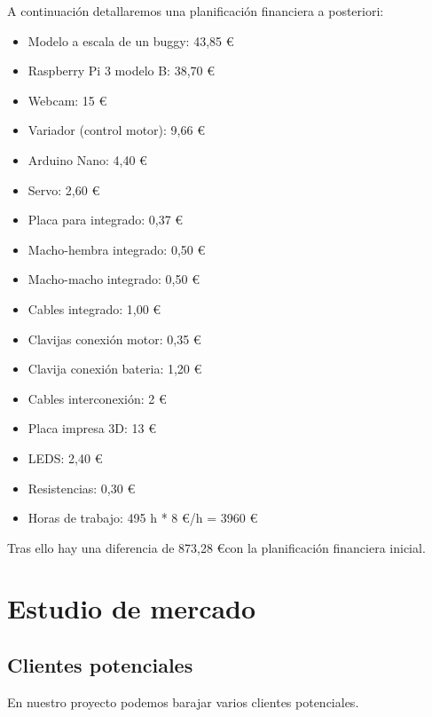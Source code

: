 \documentclass{pclass}
\begin{document}
A continuación detallaremos una planificación financiera a posteriori:
\begin{itemize}
	\item Modelo a escala de un buggy: 43,85 \euro
	\item Raspberry Pi 3 modelo B: 38,70 \euro
	\item Webcam: 15 \euro
	\item Variador (control motor): 9,66 \euro
	\item Arduino Nano: 4,40 \euro
	\item Servo: 2,60 \euro
	\item Placa para integrado: 0,37 \euro
	\item Macho-hembra integrado: 0,50 \euro
	\item Macho-macho integrado: 0,50 \euro
	\item Cables integrado: 1,00 \euro
	\item Clavijas conexión motor: 0,35 \euro
	\item Clavija conexión bateria: 1,20 \euro
	\item Cables interconexión: 2 \euro
	\item Placa impresa 3D: 13 \euro
	\item LEDS: 2,40 \euro
	\item Resistencias: 0,30 \euro
	\item Horas de trabajo: 495 h * 8 \euro/h = 3960 \euro


\end{itemize}
\medskip
{}


\medskip
Tras ello hay una diferencia de 873,28 \euro con la planificación financiera inicial.

\clearpage
\section{Estudio de mercado}
\subsection{Clientes potenciales}

	En nuestro proyecto podemos barajar varios clientes potenciales.
	
\end{document}
